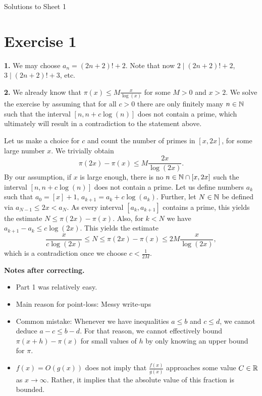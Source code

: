 \documentclass[a4paper,11pt]{article}
\begin{document}
\begin{center}
    \huge{Solutions to Sheet 1}
\end{center}

\section*{Exercise 1}
\textbf{1.} We may choose $a_n = (2n+2)!+2$. Note that now $2 \mid (2n+2)!+2$, 
$3 \mid (2n+2)!+3$, etc.

\textbf{2.} We already know that $\pi(x) \leq M \frac{x}{\log(x)}$ for some $M > 0$ 
and $x > 2$. We solve the exercise by assuming that for all $c>0$ there are only
finitely many $n \in \mathbb{N}$ such that the interval $[n, n+c \log(n)]$ does not
contain a prime, which ultimately will result in a contradiction to the statement above.

Let us make a choice for $c$ and count the number of primes in $[x, 2x]$, for
some large number $x$. We trivially obtain 
\[
    \pi(2x)-\pi(x) \leq M \frac{2x}{\log(2x)}.
\]
By our assumption, if $x$ is large enough, there is no $n\in \mathbb{N} \cap[x, 2x]$ such the 
interval $[n, n + c \log(n)]$ does not contain a prime. Let us define numbers 
$a_k$ such that $a_0 = [x]+1$, $a_{k+1} = a_k + c \log(a_k)$. Further, let 
$N\in \mathbb{N}$ be defined via $a_{N-1} \leq 2x < a_N$. As every interval 
$[a_k, a_{k+1}]$ contains a prime, this yields the estimate $N \leq \pi(2x)-\pi(x)$. 
Also, for $k < N$ we have $a_{k+1}-a_k \leq c \log(2x)$.  
This yields the estimate
\[
    \frac x{c \log(2x)} \leq N \leq \pi(2x) - \pi(x)  \leq 2M \frac{x}{\log(2x)},
\]
which is a contradiction once we choose $c < \frac 1{2M}$.

\textbf{Notes after correcting.} \leavevmode
\begin{itemize}
    \item Part 1 was relatively easy.
    \item Main reason for point-loss: Messy write-ups
    \item Common mistake: Whenever we have inequalities $a \leq b$ and $c \leq d$, 
        we cannot deduce $a - c \leq b - d$. For that reason, we cannot effectively 
        bound $\pi(x+h) - \pi(x)$ for small values of $h$ by only knowing an upper 
        bound for $\pi$. 
    \item $f(x) = O(g(x))$ does not imply that $\frac{f(x)}{g(x)}$ approaches some value
        $C \in \mathbb{R}$ as $x \to \infty$. Rather, it implies that the absolute
        value of this fraction is bounded.
\end{itemize}
\end{document}
